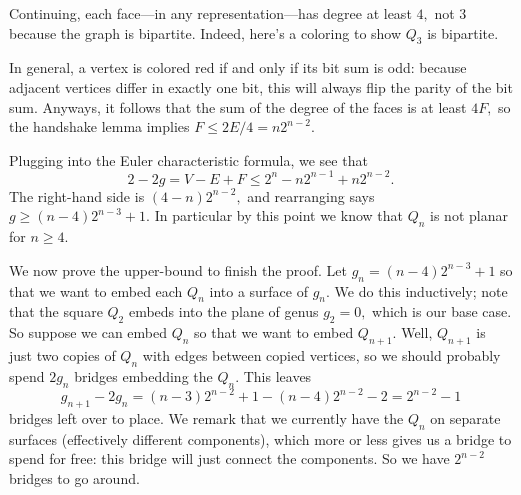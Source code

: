 Continuing, each face---in any representation---has degree at least $4,$ not $3$ because the graph is bipartite. Indeed, here's a coloring to show $Q_3$ is bipartite.
\begin{center}
\end{center}
In general, a vertex is colored red if and only if its bit sum is odd: because adjacent vertices differ in exactly one bit, this will always flip the parity of the bit sum. Anyways, it follows that the sum of the degree of the faces is at least $4F,$ so the handshake lemma implies $F\le2E/4=n2^{n-2}.$

Plugging into the Euler characteristic formula, we see that
\[2-2g=V-E+F\le2^n-n2^{n-1}+n2^{n-2}.\]
The right-hand side is $(4-n)2^{n-2},$ and rearranging says $g\ge(n-4)2^{n-3}+1.$ In particular by this point we know that $Q_n$ is not planar for $n\ge4.$

We now prove the upper-bound to finish the proof. Let $g_n=(n-4)2^{n-3}+1$ so that we want to embed each $Q_n$ into a surface of $g_n.$ We do this inductively; note that the square $Q_2$ embeds into the plane of genus $g_2=0,$ which is our base case. So suppose we can embed $Q_n$ so that we want to embed $Q_{n+1}.$ Well, $Q_{n+1}$ is just two copies of $Q_n$ with edges between copied vertices, so we should probably spend $2g_n$ bridges embedding the $Q_n.$ This leaves
\[g_{n+1}-2g_n=(n-3)2^{n-2}+1-(n-4)2^{n-2}-2=2^{n-2}-1\]
bridges left over to place. We remark that we currently have the $Q_n$ on separate surfaces (effectively different components), which more or less gives us a bridge to spend for free: this bridge will just connect the components. So we have $2^{n-2}$ bridges to go around.

